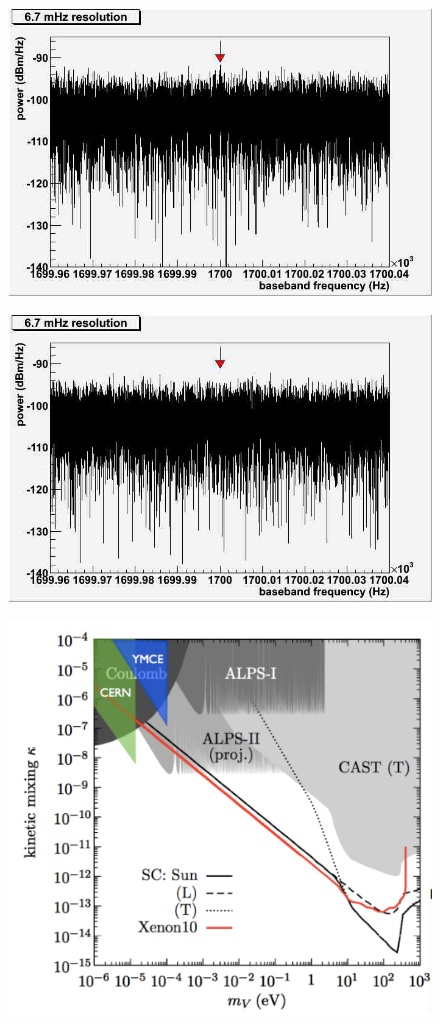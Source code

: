 \documentclass[11pt]{article}
\begin{document}
\begin{figure}
\includegraphics[scale=0.3]{malagon_ana_fig2}
\end{figure}
\begin{figure}
\includegraphics[scale=0.3]{malagon_ana_fig3}
\end{figure}

\begin{figure}
\includegraphics[scale=0.3]{malagon_ana_fig4}
\end{figure}
\end{document}
